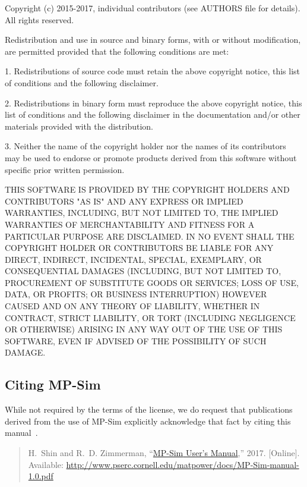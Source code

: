 \documentclass[12pt]{article}
\newcommand{\mpsim}[0]{{MP-Sim}}
\newcommand{\mpsimver}[0]{1.0}
\newcommand{\mpsimmanurl}[0]{http://www.pserc.cornell.edu/matpower/docs/MP-Sim-manual-\mpsimver.pdf}
\newcommand{\mpsimman}[0]{\href{\mpsimmanurl}{\mpsim{} User's Manual}}
\numberwithin{equation}{section}
\numberwithin{table}{section}
\numberwithin{figure}{section}
\begin{document}
\begin{Notice}
Copyright (c) 2015-2017, individual contributors (see AUTHORS file
for details).  All rights reserved.

Redistribution and use in source and binary forms, with or without
modification, are permitted provided that the following conditions
are met:

1. Redistributions of source code must retain the above copyright
notice, this list of conditions and the following disclaimer.

2. Redistributions in binary form must reproduce the above copyright
notice, this list of conditions and the following disclaimer in the
documentation and/or other materials provided with the distribution.

3. Neither the name of the copyright holder nor the names of its
contributors may be used to endorse or promote products derived from
this software without specific prior written permission.

THIS SOFTWARE IS PROVIDED BY THE COPYRIGHT HOLDERS AND CONTRIBUTORS
"AS IS" AND ANY EXPRESS OR IMPLIED WARRANTIES, INCLUDING, BUT NOT
LIMITED TO, THE IMPLIED WARRANTIES OF MERCHANTABILITY AND FITNESS
FOR A PARTICULAR PURPOSE ARE DISCLAIMED. IN NO EVENT SHALL THE
COPYRIGHT HOLDER OR CONTRIBUTORS BE LIABLE FOR ANY DIRECT, INDIRECT,
INCIDENTAL, SPECIAL, EXEMPLARY, OR CONSEQUENTIAL DAMAGES (INCLUDING,
BUT NOT LIMITED TO, PROCUREMENT OF SUBSTITUTE GOODS OR SERVICES;
LOSS OF USE, DATA, OR PROFITS; OR BUSINESS INTERRUPTION) HOWEVER
CAUSED AND ON ANY THEORY OF LIABILITY, WHETHER IN CONTRACT, STRICT
LIABILITY, OR TORT (INCLUDING NEGLIGENCE OR OTHERWISE) ARISING IN
ANY WAY OUT OF THE USE OF THIS SOFTWARE, EVEN IF ADVISED OF THE
POSSIBILITY OF SUCH DAMAGE.
\end{Notice}

\clearpage
\subsection{Citing \mpsim{}}

While not required by the terms of the license, we do request that publications derived from the use of \mpsim{} explicitly acknowledge that fact by citing
this manual~\cite{mpsim}.

\begin{quote}
\footnotesize
H.~Shin and R.~D. Zimmerman, ``\mpsimman{},'' 2017.
  [Online]. Available: \url{\mpsimmanurl}
\end{quote}
\end{document}
